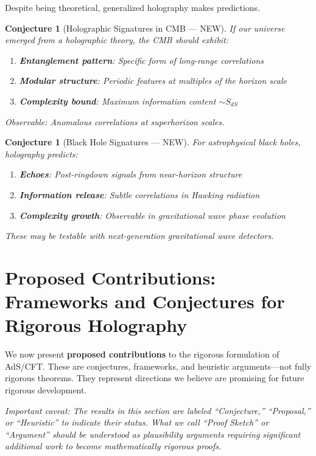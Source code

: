 \documentclass[12pt,a4paper]{article}
\newtheorem{conjecture}[theorem]{Conjecture}
\begin{document}
Despite being theoretical, generalized holography makes predictions.

\begin{conjecture}[Holographic Signatures in CMB --- NEW]
If our universe emerged from a holographic theory, the CMB should exhibit:
\begin{enumerate}
    \item \textbf{Entanglement pattern}: Specific form of long-range correlations
    \item \textbf{Modular structure}: Periodic features at multiples of the horizon scale
    \item \textbf{Complexity bound}: Maximum information content $\sim S_{dS}$
\end{enumerate}
Observable: Anomalous correlations at superhorizon scales.
\end{conjecture}

\begin{conjecture}[Black Hole Signatures --- NEW]
For astrophysical black holes, holography predicts:
\begin{enumerate}
    \item \textbf{Echoes}: Post-ringdown signals from near-horizon structure
    \item \textbf{Information release}: Subtle correlations in Hawking radiation
    \item \textbf{Complexity growth}: Observable in gravitational wave phase evolution
\end{enumerate}
These may be testable with next-generation gravitational wave detectors.
\end{conjecture}

\section{Proposed Contributions: Frameworks and Conjectures for Rigorous Holography}
\label{sec:proposals}

We now present \textbf{proposed contributions} to the rigorous formulation of AdS/CFT. These are conjectures, frameworks, and heuristic arguments---not fully rigorous theorems. They represent directions we believe are promising for future rigorous development.

\textit{Important caveat: The results in this section are labeled ``Conjecture,'' ``Proposal,'' or ``Heuristic'' to indicate their status. What we call ``Proof Sketch'' or ``Argument'' should be understood as plausibility arguments requiring significant additional work to become mathematically rigorous proofs.}
\end{document}
